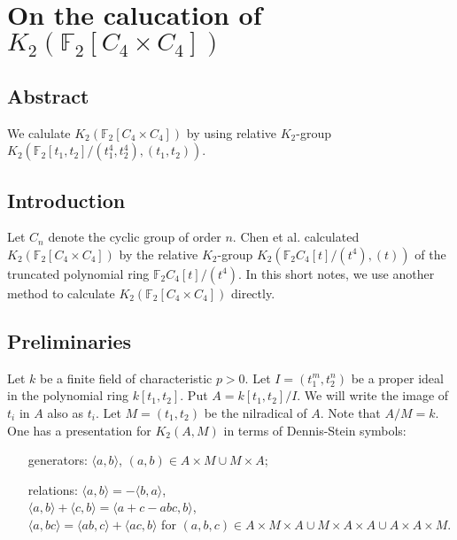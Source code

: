 \chapter{On the calucation of $K_2(\mathbb{F}_2[C_4\times C_4])$}

\section{Abstract}
We calulate $K_2(\mathbb{F}_2[C_4\times C_4])$ by using relative $K_2$-group $K_2(\mathbb{F}_2[t_1,t_2]/(t_1^4,t_2^4),(t_1,t_2))$.




\section{Introduction}
Let $C_n$ denote the cyclic group of order $n$. Chen et al.\cite{陈虹:419} calculated $K_2(\mathbb{F}_2[C_4\times C_4])$ by the relative $K_2$-group $K_2(\mathbb{F}_2C_4[t]/(t^4),(t))$ of the truncated polynomial ring $\mathbb{F}_2C_4[t]/(t^4)$. In this short notes, we use another method to calculate $K_2(\mathbb{F}_2[C_4\times C_4])$ directly.
\section{Preliminaries}
Let $k$ be a finite field of characteristic $p>0$. Let $I=(t_1^m,t_2^n)$ be a proper ideal in the polynomial ring $k[t_1,t_2]$. Put $A=k[t_1,t_2]/I$. We will write the image of $t_i$ in $A$ also as $t_i$. Let $M=(t_1,t_2)$ be the nilradical of $A$. Note that $A/M=k$. One has a presentation for $K_2(A,M)$ in terms of Dennis-Stein symbols:
\begin{itemize}
	\item[generators:]   $\langle a,b \rangle $, $(a,b)\in A\times M \cup M \times A$;
	\item[relations:] $\langle a,b\rangle = -\langle b,a \rangle$, \\
	$\langle a,b\rangle +\langle c,b \rangle=\langle a+c-abc,b\rangle$, \\
	 $\langle a,bc\rangle =\langle ab,c\rangle +\langle ac,b\rangle$ for $(a,b,c)\in A\times M \times A \cup M\times A\times A \cup A\times A\times M$.
\end{itemize}

